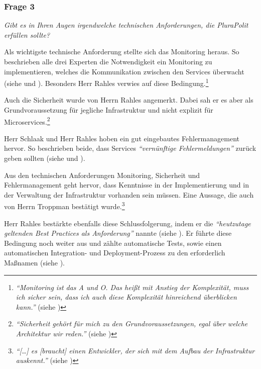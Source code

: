 \subsubsection{Frage 3}
\label{sec:frage3}

\textit{Gibt es in Ihren Augen irgendwelche technischen Anforderungen, die PluraPolit erfüllen sollte?}

Als wichtigste technische Anforderung stellte sich das Monitoring heraus. So beschrieben alle drei Experten die Notwendigkeit ein Monitoring zu implementieren, welches die Kommunikation zwischen den Services überwacht (siehe  und ). Besonders Herr Rahles verwies auf diese Bedingung.\footnote{
\textit{\enquote{Monitoring ist das A und O. Das heißt mit Anstieg der Komplexität, muss ich sicher sein, dass ich auch diese Komplexität hinreichend überblicken kann.}} (siehe )
}

Auch die Sicherheit wurde von Herrn Rahles angemerkt. Dabei sah er es aber als Grundvoraussetzung für jegliche Infrastruktur und nicht explizit für Microservices.\footnote{
\textit{\enquote{Sicherheit gehört für mich zu den Grundvoraussetzungen, egal über welche Architektur wir reden.}} (siehe )
}

Herr Schlaak und Herr Rahles hoben ein gut eingebautes Fehlermanagement hervor. So beschrieben beide, dass Services \textit{\enquote{vernünftige Fehlermeldungen}} zurück geben sollten (siehe  und ).

Aus den technischen Anforderungen Monitoring, Sicherheit und Fehlermanagement geht hervor, dass Kenntnisse in der Implementierung und in der Verwaltung der Infrastruktur vorhanden sein müssen. Eine Aussage, die auch von Herrn Troppman bestätigt wurde.\footnote{
\textit{\enquote{[…] es [braucht] einen Entwickler, der sich mit dem Aufbau der Infrastruktur auskennt.}} (siehe )
}

Herr Rahles bestärkte ebenfalls diese Schlussfolgerung, indem er die \textit{\enquote{heutzutage geltenden Best Practices als Anforderung}} nannte (siehe ). Er führte diese Bedingung noch weiter aus und zählte automatische Tests, sowie einen automatischen Integration- und Deployment-Prozess zu den erforderlich Maßnamen (siehe ).
